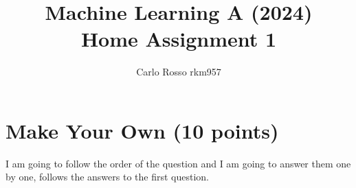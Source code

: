 \documentclass[a4paper,12pt]{article}
\begin{document}
\title{Machine Learning A (2024)\\Home Assignment 1}
\author{Carlo Rosso rkm957}
\date{}
\maketitle

\tableofcontents %
\newpage %

\section{Make Your Own (10 points)}

I am going to follow the order of the question and I am going to answer them one
by one, follows the answers to the first question.
\end{document}

